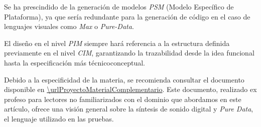 \begin{tcolorbox}[colback=blue!5,colframe=blue!75!black,title=Nota informativa]
    Se ha prescindido de la generación de modelos \textit{PSM} (Modelo Específico de Plataforma), ya que sería redundante para la generación de código en el caso de lenguajes visuales como \textit{Max} o \textit{Pure-Data}.
\end{tcolorbox}

\begin{tcolorbox}[colback=red!5,colframe=red!75!black,title=Nota importante]
    El diseño en el nivel \textit{PIM} siempre hará referencia a la estructura definida previamente en el nivel \textit{CIM}, garantizando la trazabilidad desde la idea funcional hasta la especificación más técnico\-conceptual.
\end{tcolorbox}

\begin{tcolorbox}[colback=blue!5!white,colframe=blue!75!black,title=\textbf{Recomendación}]
    Debido a la especificidad de la materia, se recomienda consultar el documento disponible en \url{\urlProyectoMaterialComplementario}. Este documento, realizado ex profeso para lectores no familiarizados con el dominio que abordamos en este artículo, ofrece una visión general sobre la síntesis de sonido digital y \textit{Pure Data}, el lenguaje utilizado en las pruebas.
\end{tcolorbox}


